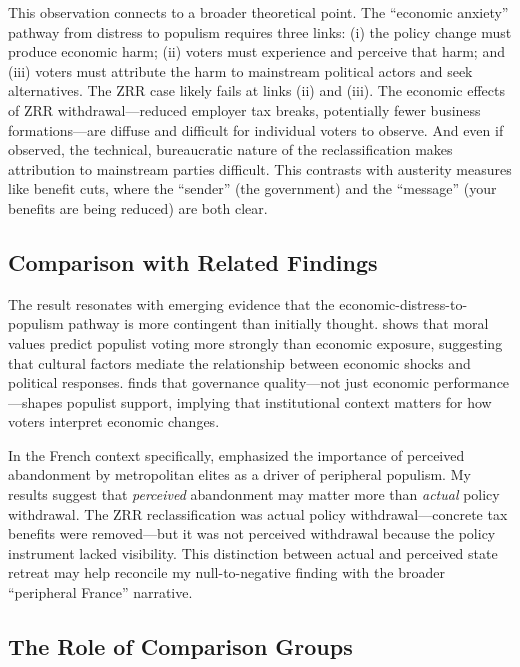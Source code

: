 \documentclass[12pt]{article}
\begin{document}
This observation connects to a broader theoretical point. The ``economic anxiety'' pathway from distress to populism requires three links: (i) the policy change must produce economic harm; (ii) voters must experience and perceive that harm; and (iii) voters must attribute the harm to mainstream political actors and seek alternatives. The ZRR case likely fails at links (ii) and (iii). The economic effects of ZRR withdrawal---reduced employer tax breaks, potentially fewer business formations---are diffuse and difficult for individual voters to observe. And even if observed, the technical, bureaucratic nature of the reclassification makes attribution to mainstream parties difficult. This contrasts with austerity measures like benefit cuts, where the ``sender'' (the government) and the ``message'' (your benefits are being reduced) are both clear.

\subsection{Comparison with Related Findings}

The result resonates with emerging evidence that the economic-distress-to-populism pathway is more contingent than initially thought. \citet{enke2020moral} shows that moral values predict populist voting more strongly than economic exposure, suggesting that cultural factors mediate the relationship between economic shocks and political responses. \citet{charron2023populism} finds that governance quality---not just economic performance---shapes populist support, implying that institutional context matters for how voters interpret economic changes.

In the French context specifically, \citet{guilluy2014france} emphasized the importance of perceived abandonment by metropolitan elites as a driver of peripheral populism. My results suggest that \textit{perceived} abandonment may matter more than \textit{actual} policy withdrawal. The ZRR reclassification was actual policy withdrawal---concrete tax benefits were removed---but it was not perceived withdrawal because the policy instrument lacked visibility. This distinction between actual and perceived state retreat may help reconcile my null-to-negative finding with the broader ``peripheral France'' narrative.

\subsection{The Role of Comparison Groups}
\end{document}
